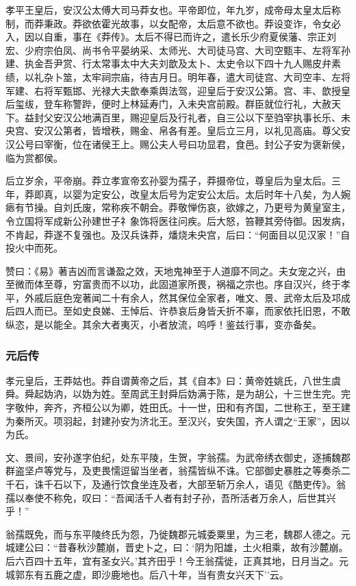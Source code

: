 \documentclass[]{article}
\begin{document}
孝平王皇后，安汉公太傅大司马莽女也。平帝即位，年九岁，成帝母太皇太后称制，而莽秉政。莽欲依霍光故事，以女配帝，太后意不欲也。莽设变诈，令女必入，因以自重，事在《莽传》。太后不得已而许之，遣长乐少府夏侯藩、宗正刘宏、少府宗伯凤、尚书令平晏纳采、太师光、大司徒马宫、大司空甄丰、左将军孙建、执金吾尹赏、行太常事太中大夫刘歆及太卜、太史令以下四十九人赐皮弁素绩，以礼杂卜筮，太牢祠宗庙，待吉月日。明年春，遣大司徒宫、大司空丰、左将军建、右将军甄邯、光禄大夫歆奉乘舆法驾，迎皇后于安汉公第。宫、丰、歆授皇后玺绂，登车称警跸，便时上林延寿门，入未央宫前殿。群臣就位行礼，大赦天下。益封父安汉公地满百里，赐迎皇后及行礼者，自三公以下至驺宰执事长乐、未央宫、安汉公第者，皆增秩，赐金、帛各有差。皇后立三月，以礼见高庙。尊父安汉公号曰宰衡，位在诸侯王上。赐公夫人号曰功显君，食邑。封公子安为褒新侯，临为赏都侯。

后立岁余，平帝崩。莽立孝宣帝玄孙婴为孺子，莽摄帝位，尊皇后为皇太后。三年，莽即真，以婴为定安公，改皇太后号为定安公太后。太后时年十八矣，为人婉瘱有节操。自刘氏废，常称疾不朝会。莽敬惮伤哀，欲嫁之，乃更号为黄皇室主，令立国将军成新公孙建世子礻象饰将医往问疾。后大怒，笞鞭其旁侍御。因发病，不肯起，莽遂不复强也。及汉兵诛莽，燔烧未央宫，后曰：``何面目以见汉家！''自投火中而死。

赞曰：《易》著吉凶而言谦盈之效，天地鬼神至于人道靡不同之。夫女宠之兴，由至微而体至尊，穷富贵而不以功，此固道家所畏，祸福之宗也。序自汉兴，终于孝平，外戚后庭色宠著闻二十有余人，然其保位全家者，唯文、景、武帝太后及邛成后四人而已。至如史良娣、王悼后、许恭哀后身皆夭折不辜，而家依托旧恩，不敢纵恣，是以能全。其余大者夷灭，小者放流，呜呼！鉴兹行事，变亦备矣。

\hypertarget{header-n6684}{%
\subsubsection{元后传}\label{header-n6684}}

孝元皇后，王莽姑也。莽自谓黄帝之后，其《自本》曰：黄帝姓姚氏，八世生虞舜。舜起妫汭，以妫为姓。至周武王封舜后妫满于陈，是为胡公，十三世生完。完字敬仲，奔齐，齐桓公以为卿，姓田氏。十一世，田和有齐国，二世称王，至王建为秦所灭。项羽起，封建孙安为济北王。至汉兴，安失国，齐人谓之``王家''，因以为氏。

文、景间，安孙遂字伯纪，处东平陵，生贺，字翁孺。为武帝绣衣御史，逐捕魏郡群盗坚卢等党与，及吏畏懦逗留当坐者，翁孺皆纵不诛。它部御史暴胜之等奏杀二千石，诛千石以下，及通行饮食坐连及者，大部至斩万余人，语见《酷吏传》。翁孺以奉使不称免，叹曰：``吾闻活千人者有封子孙，吾所活者万余人，后世其兴乎！''

翁孺既免，而与东平陵终氏为怨，乃徙魏郡元城委粟里，为三老，魏郡人德之。元城建公曰：``昔春秋沙麓崩，晋史卜之，曰：`阴为阳雄，土火相乘，故有沙麓崩。后六百四十五年，宜有圣女兴。'其齐田乎！今王翁孺徙，正真其地，日月当之。元城郭东有五鹿之虚，即沙鹿地也。后八十年，当有贵女兴天下''云。
\end{document}

